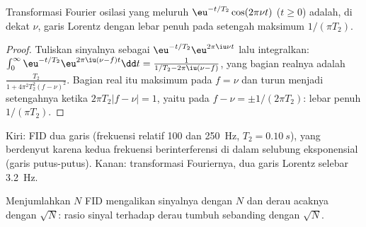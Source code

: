 \begin{theorem}\label{thm:b3:advanced-nmr:lorentzian}
Transformasi Fourier osilasi yang meluruh $\eu^{-t/T_2}\cos(2\pi\nu t)$ ($t \ge 0$)
adalah, di dekat $\nu$, garis Lorentz dengan lebar penuh pada setengah
maksimum $1/(\pi T_2)$.
\end{theorem}

\begin{proof}
Tuliskan sinyalnya sebagai $\eu^{-t/T_2}\eu^{2\pi\iu\nu t}$ lalu integralkan:
$\int_0^\infty\eu^{-t/T_2}\eu^{2\pi\iu(\nu - f)t}\dd t = \frac{1}{1/T_2 - 2\pi\iu(\nu - f)}$, yang
bagian realnya adalah $\frac{T_2}{1 + 4\pi^2T_2^2(f - \nu)^2}$. Bagian real itu
maksimum pada $f = \nu$ dan turun menjadi setengahnya ketika
$2\pi T_2|f - \nu| = 1$, yaitu pada $f - \nu = \pm1/(2\pi T_2)$: lebar penuh
$1/(\pi T_2)$.
\end{proof}

\begin{omfigure}

{\small Kiri: FID dua garis (frekuensi relatif 100 dan \qty{250}{Hz},
$T_2 = \qty{0.10}{s}$), yang berdenyut karena kedua frekuensi berinterferensi
di dalam selubung eksponensial (garis putus-putus). Kanan: transformasi
Fouriernya, dua garis Lorentz selebar \qty{3.2}{Hz}.}
\end{omfigure}

\begin{proposition}\label{prop:b3:advanced-nmr:averaging}
Menjumlahkan $N$ FID mengalikan sinyalnya dengan $N$ dan derau acaknya dengan
$\sqrt N$: rasio sinyal terhadap derau tumbuh sebanding dengan $\sqrt N$.
\end{proposition}

